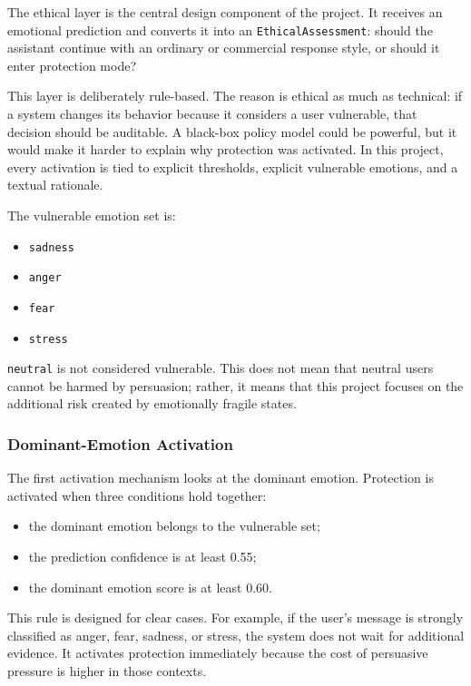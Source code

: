 \documentclass[11pt,a4paper]{article}
\newcommand{\code}[1]{\texttt{#1}}
\begin{document}
The ethical layer is the central design component of the project. It receives an emotional
prediction and converts it into an \code{EthicalAssessment}: should the assistant continue with an
ordinary or commercial response style, or should it enter protection mode?

This layer is deliberately rule-based. The reason is ethical as much as technical: if a
system changes its behavior because it considers a user vulnerable, that decision should be
auditable. A black-box policy model could be powerful, but it would make it harder to
explain why protection was activated. In this project, every activation is tied to explicit
thresholds, explicit vulnerable emotions, and a textual rationale.

The vulnerable emotion set is:

\begin{itemize}[leftmargin=1.8em]
\item \code{sadness}
\item \code{anger}
\item \code{fear}
\item \code{stress}
\end{itemize}

\code{neutral} is not considered vulnerable. This does not mean that neutral users cannot
be harmed by persuasion; rather, it means that this project focuses on the additional risk
created by emotionally fragile states.

\subsubsection{Dominant-Emotion Activation}

The first activation mechanism looks at the dominant emotion. Protection is activated when
three conditions hold together:

\begin{itemize}[leftmargin=1.8em]
\item the dominant emotion belongs to the vulnerable set;
\item the prediction confidence is at least 0.55;
\item the dominant emotion score is at least 0.60.
\end{itemize}

This rule is designed for clear cases. For example, if the user's message is strongly
classified as anger, fear, sadness, or stress, the system does not wait for additional
evidence. It activates protection immediately because the cost of persuasive pressure is
higher in those contexts.
\end{document}
